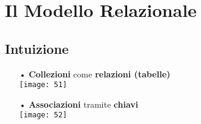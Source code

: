 \documentclass[12pt, letterpaper]{article}
\begin{document}
\section{Il Modello Relazionale}

\subsection{Intuizione}

\begin{itemize}
   \item[•] \textbf{Collezioni} come \textbf{relazioni (tabelle)}
      \\
      \texttt{[image: 51]}
   \item[•] \textbf{Associazioni} tramite \textbf{chiavi}
      \\
      \texttt{[image: 52]}
\end{itemize}
\end{document}
